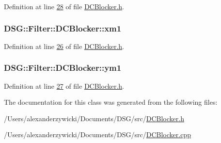 Definition at line \hyperlink{_d_c_blocker_8h_source_l00028}{28} of file \hyperlink{_d_c_blocker_8h_source}{D\+C\+Blocker.\+h}.

\hypertarget{class_d_s_g_1_1_filter_1_1_d_c_blocker_aace7bdafac8d0b4acf9d09bb368f6486}{
\subsubsection[{xm1}]{ D\+S\+G\+::\+Filter\+::\+D\+C\+Blocker\+::xm1\hspace{0.3cm}{\ttfamily [protected]}}}\label{class_d_s_g_1_1_filter_1_1_d_c_blocker_aace7bdafac8d0b4acf9d09bb368f6486}


Definition at line \hyperlink{_d_c_blocker_8h_source_l00026}{26} of file \hyperlink{_d_c_blocker_8h_source}{D\+C\+Blocker.\+h}.

\hypertarget{class_d_s_g_1_1_filter_1_1_d_c_blocker_a61689c80d7fb0f25144fc84996396d71}{
\subsubsection[{ym1}]{ D\+S\+G\+::\+Filter\+::\+D\+C\+Blocker\+::ym1\hspace{0.3cm}{\ttfamily [protected]}}}\label{class_d_s_g_1_1_filter_1_1_d_c_blocker_a61689c80d7fb0f25144fc84996396d71}


Definition at line \hyperlink{_d_c_blocker_8h_source_l00027}{27} of file \hyperlink{_d_c_blocker_8h_source}{D\+C\+Blocker.\+h}.



The documentation for this class was generated from the following files\+:\begin{DoxyCompactItemize}
\item 
/\+Users/alexanderzywicki/\+Documents/\+D\+S\+G/src/\hyperlink{_d_c_blocker_8h}{D\+C\+Blocker.\+h}\item 
/\+Users/alexanderzywicki/\+Documents/\+D\+S\+G/src/\hyperlink{_d_c_blocker_8cpp}{D\+C\+Blocker.\+cpp}\end{DoxyCompactItemize}

